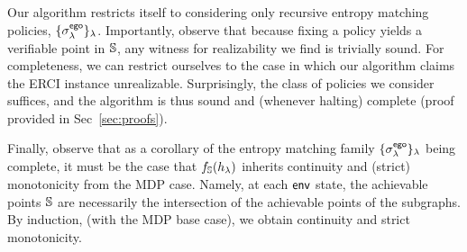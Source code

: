 
Our algorithm restricts itself to considering only recursive entropy
matching policies, $\{\sigma^{\mathsf{ego}}_\lambda\}_\lambda$.  Importantly,
observe that because fixing a policy yields a verifiable point in
$\mathbb{S}$, any witness for realizability we find is trivially sound. For completeness, we can restrict ourselves to the case in which our
algorithm claims the ERCI instance unrealizable. Surprisingly, the class of policies we consider suffices, and the algorithm 
is thus sound and (whenever halting) complete (proof provided in Sec~\ref{sec:proofs}).

Finally, observe that as a corollary of the entropy matching family
$\{\sigma^{\mathsf{ego}}_\lambda\}_\lambda$ being complete, it must be the case that
$f_\mathbb{S}(h_\lambda)$ inherits continuity and (strict) monotonicity
from the MDP case. Namely, at each $\mathsf{env}$ state, the achievable
points $\mathbb{S}$ are necessarily the intersection of the achievable
points of the subgraphs. By induction, (with the MDP base case), we
obtain continuity and strict monotonicity.


